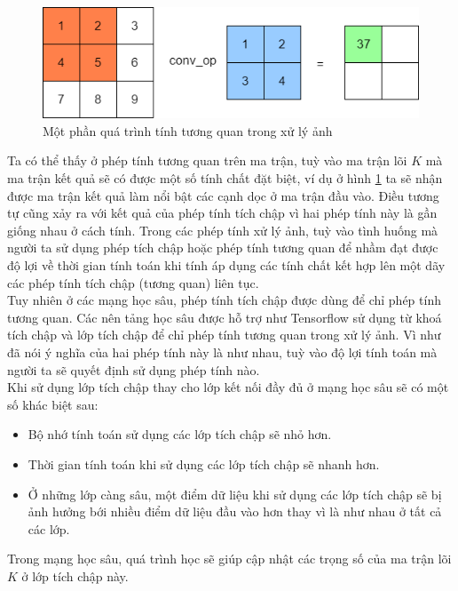 \begin{figure}[h]
\centering
    \includegraphics[totalheight=3cm]{Images/conv.png}
    \caption{Một phần quá trình tính tương quan trong xử lý ảnh}
    \label{convExample}
\end{figure}
Ta có thể thấy ở phép tính tương quan trên ma trận, tuỳ vào ma trận lõi $K$ mà ma trận kết quả sẽ có được một số tính chất đặt biệt, ví dụ ở hình \ref{convExample} ta sẽ nhận được ma trận kết quả làm nổi bật các cạnh dọc ở ma trận đầu vào. Điều tương tự cũng xảy ra với kết quả của phép tính tích chập vì hai phép tính này là gần giống nhau ở cách tính. Trong các phép tính xử lý ảnh, tuỳ vào tình huống mà người ta sử dụng phép tích chập hoặc phép tính tương quan để nhầm đạt được độ lợi về thời gian tính toán khi tính áp dụng các tính chất kết hợp lên một dãy các phép tính tích chập (tương quan) liên tục\cite{convtheorem}.\\
Tuy nhiên ở các mạng học sâu, phép tính tích chập được dùng để chỉ phép tính tương quan. Các nên tảng học sâu được hỗ trợ như Tensorflow sử dụng từ khoá tích chập và lớp tích chập để chỉ phép tính tương quan trong xử lý ảnh. Vì như đã nói ý nghĩa của hai phép tính này là như nhau, tuỳ vào độ lợi tính toán mà người ta sẽ quyết định sử dụng phép tính nào.\\
Khi sử dụng lớp tích chập thay cho lớp kết nối đầy đủ ở mạng học sâu sẽ có một số khác biệt sau:
\begin{itemize}
    \item Bộ nhớ tính toán sử dụng các lớp tích chập sẽ nhỏ hơn.
    \item Thời gian tính toán khi sử dụng các lớp tích chập sẽ nhanh hơn.
    \item Ở những lớp càng sâu, một điểm dữ liệu khi sử dụng các lớp tích chập sẽ bị ảnh hưởng bới nhiều điểm dữ liệu đầu vào hơn thay vì là như nhau ở tất cả các lớp.
\end{itemize} 
Trong mạng học sâu, quá trình học sẽ giúp cập nhật các trọng số của ma trận lõi $K$ ở lớp tích chập này.

